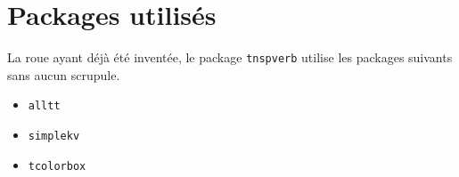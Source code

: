 \documentclass[12pt,a4paper]{article}
\begin{document}
\section{Packages utilisés}

La roue ayant déjà été inventée, le package \verb#tnspverb# utilise les packages suivants sans aucun scrupule.

\begin{multicols}{4}
    \begin{itemize}
        \item \verb#alltt#
        \item \verb#simplekv#
        \item \verb#tcolorbox#
    \end{itemize}
\end{multicols}
\end{document}
